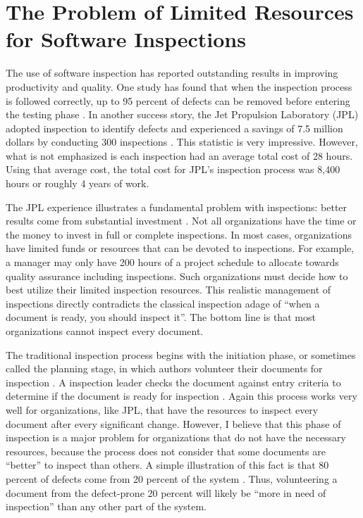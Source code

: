
\section{The Problem of Limited Resources for Software Inspections}
The use of software inspection has reported outstanding results in
improving productivity and quality. One study has found that when the
inspection process is followed correctly, up to 95 percent of defects can
be removed before entering the testing phase \cite{Bush90}. In another
success story, the Jet Propulsion Laboratory (JPL) adopted inspection to
identify defects and experienced a savings of 7.5 million dollars by
conducting 300 inspections \cite{Bush90a}. This statistic is very
impressive. However, what is not emphasized is each inspection had an
average total cost of 28 hours. Using that average cost, the total cost for
JPL's inspection process was 8,400 hours or roughly 4 years of work.

The JPL experience illustrates a fundamental problem with inspections:
better results come from substantial investment \cite{Gilb93}. Not all
organizations have the time or the money to invest in full or complete
inspections. In most cases, organizations have limited funds or resources
that can be devoted to inspections. For example, a manager may only have
200 hours of a project schedule to allocate towards quality assurance
including inspections. Such organizations must decide how to best utilize
their limited inspection resources. This realistic management of
inspections directly contradicts the classical inspection adage of ``when a
document is ready, you should inspect it''. The bottom line is that most
organizations cannot inspect every document.

The traditional inspection process begins with the initiation phase, or
sometimes called the planning stage, in which authors volunteer their
documents for inspection \cite {Gilb93}. A inspection leader checks the
document against entry criteria to determine if the document is ready for
inspection \cite{Ebenau94, Gilb93}. Again this process works very well for
organizations, like JPL, that have the resources to inspect every document
after every significant change. However, I believe that this phase of
inspection is a major problem for organizations that do not have the
necessary resources, because the process does not consider that some
documents are ``better'' to inspect than others. A simple illustration of
this fact is that 80 percent of defects come from 20 percent of the system
\cite{Boehm01}.  Thus, volunteering a document from the defect-prone 20
percent will likely be ``more in need of inspection'' than any other part
of the system.

